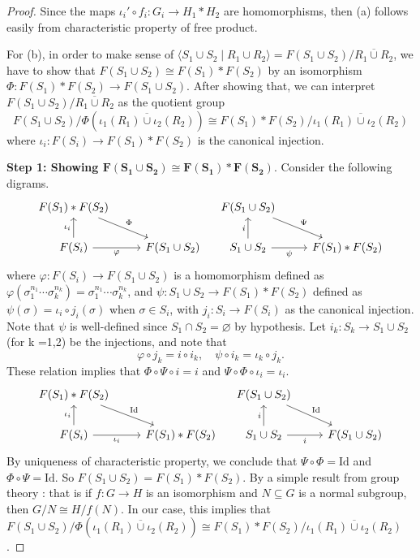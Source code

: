 \documentclass[a4paper]{article}
\theoremstyle{remark}
\newcommand{\Id}{\text{Id}} %
\newcommand\metric[1]{\langle#1\rangle}
\begin{document}
\begin{proof}
	Since the maps $\iota_i ' \circ f_i : G_i \to H_1 * H_2$ are homomorphisms, then (a) follows easily from characteristic property of free product.
	
	For (b), in order to make sense of $\metric{S_1 \cup S_2 \mid R_1 \cup R_2} = F(S_1 \cup S_2)/\overline{R_1 \cup R_2}$, we have to show that $F(S_1 \cup S_2) \cong F(S_1) * F(S_2)$ by an isomorphism $\Phi : F(S_1)*F(S_2) \to F(S_1 \cup S_2)$. After showing that, we can interpret $F(S_1 \cup S_2)/\overline{R_1 \cup R_2}$ as the quotient group 
	$$
	F(S_1 \cup S_2)/\Phi(\overline{\iota_1(R_1)\cup \iota_2(R_2)}) \cong F(S_1) * F(S_2)/\overline{\iota_1(R_1)\cup \iota_2(R_2)}
	$$ 
	where $\iota_i : F(S_i) \to F(S_1)*F(S_2)$ is the canonical injection. 
	
	\textbf{Step 1: Showing $\mathbf{F(S_1 \cup S_2) \cong F(S_1) * F(S_2)}$}. Consider the following digrams.
	\[
	\begin{tikzcd}
	F(S_1)*F(S_2) \arrow[dr,"\Phi"]& \\
	F(S_i) \arrow[u,"\iota_i"] \arrow[r,"\varphi",swap] & F(S_1 \cup S_2)
	\end{tikzcd}
    \quad
	\begin{tikzcd}
	F(S_1 \cup S_2) \arrow[dr,"\Psi"]& \\
	S_1 \cup S_2 \arrow[u,"i"] \arrow[r,"\psi",swap] & F(S_1)*F(S_2)
	\end{tikzcd} 
	\]
	where $\varphi : F(S_i) \to F(S_1 \cup S_2)$ is a homomorphism defined as $\varphi (\sigma_1^{n_1}\cdots \sigma_k^{n_k}) = \sigma_1^{n_1}\cdots \sigma_k^{n_k}$, and $\psi : S_1 \cup S_2 \to F(S_1)*F(S_2)$ defined as $\psi(\sigma) = \iota_i \circ j_i (\sigma)$ when $\sigma \in S_i$, with $j_i : S_i \to F(S_i)$ as the canonical injection. Note that $\psi$ is well-defined since $S_1 \cap S_2= \varnothing$ by hypothesis. Let $i_k : S_k \to S_1 \cup S_2$ (for k =1,2) be the injections, and note that 
	$$
	\varphi \circ j_k = i \circ i_k, \quad \psi \circ i_k = \iota_k \circ j_k. 
	$$
	These relation implies that $\Phi \circ \Psi \circ i = i$ and $\Psi \circ \Phi \circ \iota_i = \iota_i$. 
	\[
	\begin{tikzcd}
	F(S_1)*F(S_2) \arrow[dr,"\Id"]& \\
	F(S_i) \arrow[u,"\iota_i"] \arrow[r,"\iota_i",swap] & F(S_1)*F(S_2) 
	\end{tikzcd}
	\quad
	\begin{tikzcd}
	F(S_1 \cup S_2) \arrow[dr,"\Id"]& \\
	S_1 \cup S_2 \arrow[u,"i"] \arrow[r,"i",swap] & F(S_1 \cup S_2)
	\end{tikzcd} 
	\]
	By uniqueness of characteristic property, we conclude that $\Psi \circ \Phi = \Id$ and $\Phi \circ \Psi = \Id$. So $F(S_1 \cup S_2) = F(S_1) * F(S_2)$. By a simple result from group theory : that is if $f: G\to H$ is an isomorphism and $N \subseteq G $ is a normal subgroup, then $G/N \cong H/f(N)$. In our case, this implies that $	F(S_1 \cup S_2)/\Phi(\overline{\iota_1(R_1)\cup \iota_2(R_2)}) \cong F(S_1) * F(S_2)/\overline{\iota_1(R_1)\cup \iota_2(R_2)}$.  
	

\end{proof}
\end{document}
